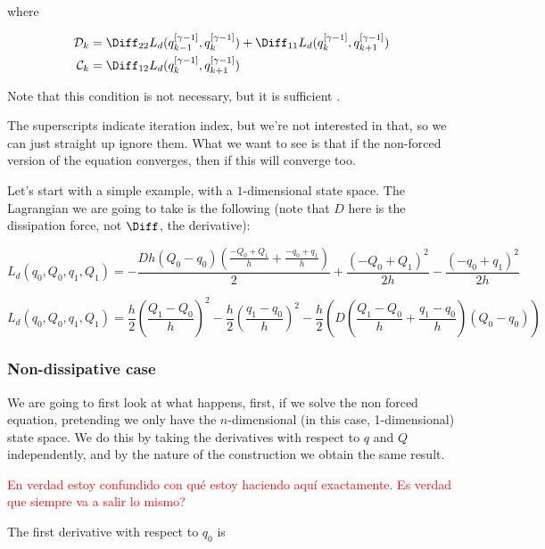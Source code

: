 \documentclass{article}
\begin{document}
where 

\begin{align*}    
    \mathcal{D}_k &= \Diff_{22} L_d (q_{k-1}^{[\gamma - 1]}, q_k^{[\gamma - 1]}) + \Diff_{1 1} L_d (q_k^{[\gamma - 1]}, q_{k+1}^{[\gamma - 1]}) \\
    \mathcal{C}_k &= \Diff_{12} L_d (q_k^{[\gamma - 1]}, q_{k+1}^{[\gamma - 1]})
\end{align*}

Note that this condition is not necessary, but it is sufficient .

The superscripts indicate iteration index, but we're not interested in that, so we can just straight up ignore them. What we want to see is that if the non-forced version of the equation converges, then if this will converge too. 

Let's start with a simple example, with a $1$-dimensional state space. The Lagrangian we are going to take is the following (note that $D$ here is the dissipation force, not $\Diff$, the derivative):


\[ L_d (q_0, Q_0, q_1, Q_1) = - \frac{D h \left(Q_{0} - q_{0}\right) \left(\frac{- Q_{0} + Q_{1}}{h} + \frac{- q_{0} + q_{1}}{h}\right)}{2} + \frac{\left(- Q_{0} + Q_{1}\right)^{2}}{2 h} - \frac{\left(- q_{0} + q_{1}\right)^{2}}{2 h} \]

\[ L_d (q_0, Q_0, q_1, Q_1) =
            \frac{h}{2} \left(\frac{Q_1 - Q_0}{h}\right)^2
            - \frac{h}{2} \left(\frac{q_1 - q_0}{h}\right)^2
            - \frac{h}{2} \left(D \left(\frac{Q_1 - Q_0}{h} + \frac{q_1 - q_0}{h}\right) (Q_0 - q_0)\right)
\]

\subsubsection{Non-dissipative case}

We are going to first look at what happens, first, if we solve the non forced equation, pretending we only have the $n$-dimensional (in this case, 1-dimensional) state space. We do this by taking the derivatives with respect to $q$ and $Q$ independently, and by the nature of the construction we obtain the same result. 

\textcolor{red}{En verdad estoy confundido con qué estoy haciendo aquí exactamente. Es verdad que siempre va a salir lo mismo?}

The first derivative with respect to $q_0$ is
\end{document}
